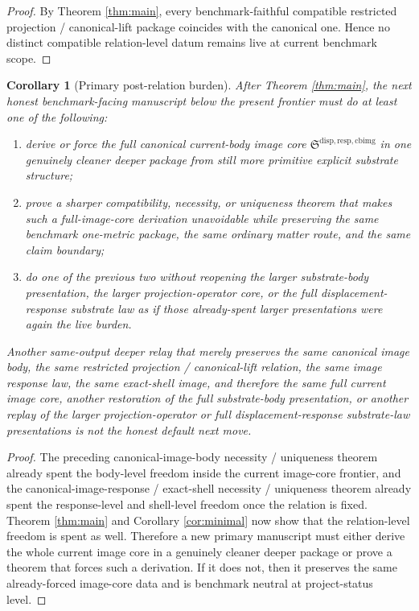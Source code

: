 \documentclass[11pt]{article}
\newcommand{\CurrentBodyImageCore}{\mathfrak S^{\mathrm{disp,resp,cbimg}}}
\newtheorem{corollary}{Corollary}
\begin{document}
\begin{proof}
By Theorem \ref{thm:main}, every benchmark-faithful compatible restricted projection / canonical-lift package coincides with the canonical one. Hence no distinct compatible relation-level datum remains live at current benchmark scope.
\end{proof}

\begin{corollary}[Primary post-relation burden]
\label{cor:next}
After Theorem \ref{thm:main}, the next honest benchmark-facing manuscript below the present frontier must do at least one of the following:
\begin{enumerate}
    \item derive or force the full canonical current-body image core \(\CurrentBodyImageCore\) in one genuinely cleaner deeper package from still more primitive explicit substrate structure;
    \item prove a sharper compatibility, necessity, or uniqueness theorem that makes such a full-image-core derivation unavoidable while preserving the same benchmark one-metric package, the same ordinary matter route, and the same claim boundary;
    \item do one of the previous two without reopening the larger substrate-body presentation, the larger projection-operator core, or the full displacement-response substrate law as if those already-spent larger presentations were again the live burden.
\end{enumerate}
Another same-output deeper relay that merely preserves the same canonical image body, the same restricted projection / canonical-lift relation, the same image response law, the same exact-shell image, and therefore the same full current image core, another restoration of the full substrate-body presentation, or another replay of the larger projection-operator or full displacement-response substrate-law presentations is not the honest default next move.
\end{corollary}

\begin{proof}
The preceding canonical-image-body necessity / uniqueness theorem already spent the body-level freedom inside the current image-core frontier, and the canonical-image-response / exact-shell necessity / uniqueness theorem already spent the response-level and shell-level freedom once the relation is fixed. Theorem \ref{thm:main} and Corollary \ref{cor:minimal} now show that the relation-level freedom is spent as well. Therefore a new primary manuscript must either derive the whole current image core in a genuinely cleaner deeper package or prove a theorem that forces such a derivation. If it does not, then it preserves the same already-forced image-core data and is benchmark neutral at project-status level.
\end{proof}
\end{document}
